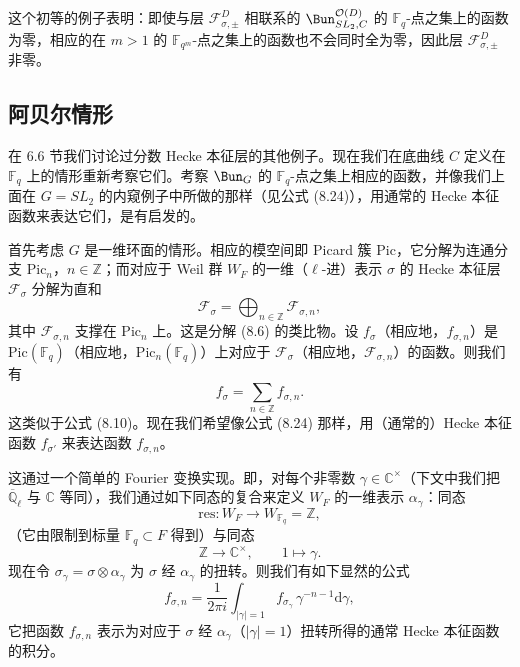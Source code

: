 这个初等的例子表明：即使与层 $\mathcal{F}^D_{\sigma,\pm}$ 相联系的 $\Bun^{\mathcal{O}(D)}_{SL_2,C}$ 的 $\mathbb{F}_q$-点之集上的函数为零，相应的在 $m > 1$ 的 $\mathbb{F}_{q^m}$-点之集上的函数也不会同时全为零，因此层 $\mathcal{F}^D_{\sigma,\pm}$ 非零。

\subsection{阿贝尔情形}

在 6.6 节我们讨论过分数 Hecke 本征层的其他例子。现在我们在底曲线 $C$ 定义在 $\mathbb{F}_q$ 上的情形重新考察它们。考察 $\Bun_G$ 的 $\mathbb{F}_q$-点之集上相应的函数，并像我们上面在 $G = SL_2$ 的内窥例子中所做的那样（见公式 (8.24)），用通常的 Hecke 本征函数来表达它们，是有启发的。

首先考虑 $G$ 是一维环面的情形。相应的模空间即 Picard 簇 $\mathrm{Pic}$，它分解为连通分支 $\mathrm{Pic}_n$，$n\in \mathbb{Z}$；而对应于 Weil 群 $W_F$ 的一维（$\ell$-进）表示 $\sigma$ 的 Hecke 本征层 $\mathcal{F}_\sigma$ 分解为直和
\begin{equation}\tag{8.25}
\mathcal{F}_\sigma = \bigoplus_{n\in\mathbb{Z}} \mathcal{F}_{\sigma,n},
\end{equation}
其中 $\mathcal{F}_{\sigma,n}$ 支撑在 $\mathrm{Pic}_n$ 上。这是分解 (8.6) 的类比物。设 $f_\sigma$（相应地，$f_{\sigma,n}$）是 $\mathrm{Pic}(\mathbb{F}_q)$（相应地，$\mathrm{Pic}_n(\mathbb{F}_q)$）上对应于 $\mathcal{F}_\sigma$（相应地，$\mathcal{F}_{\sigma,n}$）的函数。则我们有
\[
f_\sigma = \sum_{n\in\mathbb{Z}} f_{\sigma,n}.
\]
这类似于公式 (8.10)。现在我们希望像公式 (8.24) 那样，用（通常的）Hecke 本征函数 $f_{\sigma'}$ 来表达函数 $f_{\sigma,n}$。

这通过一个简单的 Fourier 变换实现。即，对每个非零数 $\gamma\in\mathbb{C}^\times$（下文中我们把 $\overline{\mathbb{Q}}_\ell$ 与 $\mathbb{C}$ 等同），我们通过如下同态的复合来定义 $W_F$ 的一维表示 $\alpha_\gamma$：同态
\begin{equation}\tag{8.26}
\mathrm{res} : W_F \to W_{\mathbb{F}_q} = \mathbb{Z},
\end{equation}
（它由限制到标量 $\mathbb{F}_q\subset F$ 得到）与同态
\[
\mathbb{Z}\to \mathbb{C}^\times, \qquad 1\mapsto \gamma.
\]
现在令 $\sigma_\gamma = \sigma\otimes\alpha_\gamma$ 为 $\sigma$ 经 $\alpha_\gamma$ 的扭转。则我们有如下显然的公式
\begin{equation}\tag{8.27}
f_{\sigma,n} = \frac{1}{2\pi i}\int_{|\gamma|=1} f_{\sigma_\gamma}\,\gamma^{-n-1}\mathrm{d}\gamma,
\end{equation}
它把函数 $f_{\sigma,n}$ 表示为对应于 $\sigma$ 经 $\alpha_\gamma$（$|\gamma|=1$）扭转所得的通常 Hecke 本征函数的积分。

